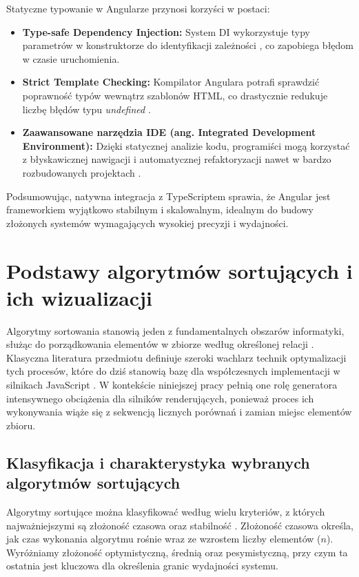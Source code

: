\documentclass[12pt,openright,twoside]{report}
\begin{document}
Statyczne typowanie w Angularze przynosi korzyści w postaci:
\begin{itemize}
    \item \textbf{Type-safe Dependency Injection:} System DI wykorzystuje typy parametrów w konstruktorze do identyfikacji zależności \cite{Angular_Development}, co zapobiega błędom w czasie uruchomienia.
    \item \textbf{Strict Template Checking:} Kompilator Angulara potrafi sprawdzić poprawność typów wewnątrz szablonów HTML, co drastycznie redukuje liczbę błędów typu \textit{undefined} \cite{Angular_Docs}.
    \item \textbf{Zaawansowane narzędzia IDE (ang. Integrated Development Environment):} Dzięki statycznej analizie kodu, programiści mogą korzystać z błyskawicznej nawigacji i automatycznej refaktoryzacji nawet w bardzo rozbudowanych projektach \cite{Learning_TS}.
\end{itemize}

Podsumowując, natywna integracja z TypeScriptem sprawia, że Angular jest frameworkiem wyjątkowo stabilnym i skalowalnym, idealnym do budowy złożonych systemów wymagających wysokiej precyzji i wydajności.

\section{Podstawy algorytmów sortujących i ich wizualizacji}
Algorytmy sortowania stanowią jeden z fundamentalnych obszarów informatyki, służąc do porządkowania elementów w zbiorze według określonej relacji \cite{Cormen_Intro}. Klasyczna literatura przedmiotu definiuje szeroki wachlarz technik optymalizacji tych procesów, które do dziś stanowią bazę dla współczesnych implementacji w silnikach JavaScript \cite{Knuth_Sorting}. W kontekście niniejszej pracy pełnią one rolę generatora intensywnego obciążenia dla silników renderujących, ponieważ proces ich wykonywania wiąże się z sekwencją licznych porównań i zamian miejsc elementów zbioru.

\subsection{Klasyfikacja i charakterystyka wybranych algorytmów sortujących}
Algorytmy sortujące można klasyfikować według wielu kryteriów, z których najważniejszymi są złożoność czasowa oraz stabilność \cite{Algorithms_Unlocked}. Złożoność czasowa określa, jak czas wykonania algorytmu rośnie wraz ze wzrostem liczby elementów ($n$). Wyróżniamy złożoność optymistyczną, średnią oraz pesymistyczną, przy czym ta ostatnia jest kluczowa dla określenia granic wydajności systemu.
\end{document}
